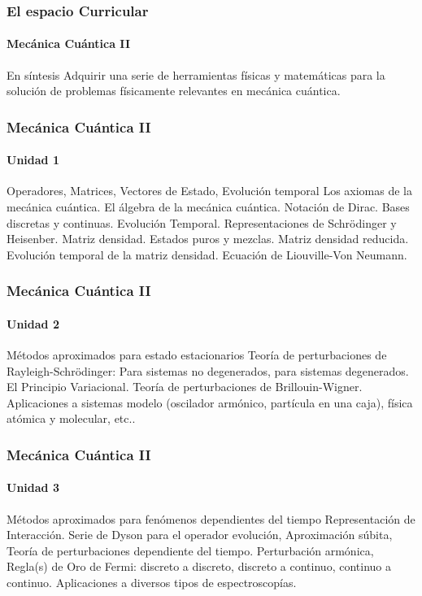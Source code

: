 \documentclass{beamer}
\begin{document}
\begin{frame}
    \frametitle{El espacio Curricular}
    \framesubtitle{Mecánica Cuántica II}

\begin{block}{En síntesis}
    Adquirir una serie de herramientas físicas y matemáticas para la solución
    de problemas físicamente relevantes en mecánica cuántica.
\end{block}
    
\end{frame}

\begin{frame}
    \frametitle{Mecánica Cuántica II}
    \framesubtitle{Unidad 1}

\begin{block}{Operadores, Matrices, Vectores de Estado, Evolución temporal}
    Los axiomas de la mecánica cuántica. El álgebra de la mecánica       
    cuántica. Notación de Dirac. Bases discretas y continuas. Evolución  
    Temporal. Representaciones de Schrödinger y Heisenber. Matriz        
    densidad. Estados puros y mezclas. Matriz densidad reducida.         
    Evolución temporal de la matriz densidad. Ecuación de Liouville-Von  
    Neumann.    
\end{block}
    
\end{frame}

\begin{frame}
    \frametitle{Mecánica Cuántica II}
    \framesubtitle{Unidad 2}

\begin{block}{Métodos aproximados para estado estacionarios}
    Teoría de perturbaciones de Rayleigh-Schrödinger: Para sistemas no   
     degenerados, para sistemas degenerados. El Principio Variacional.    
     Teoría de perturbaciones de Brillouin-Wigner. Aplicaciones a         
     sistemas modelo (oscilador armónico, partícula en una caja), física  
     atómica y molecular, etc.. 
\end{block}
    
\end{frame}

\begin{frame}
    \frametitle{Mecánica Cuántica II}
    \framesubtitle{Unidad 3}

\begin{block}{Métodos aproximados para fenómenos dependientes del tiempo}
    Representación de Interacción. Serie de Dyson para el operador       
     evolución, Aproximación súbita, Teoría de perturbaciones dependiente 
     del tiempo. Perturbación armónica, Regla(s) de Oro de Fermi:         
     discreto a discreto, discreto a continuo, continuo a continuo.       
     Aplicaciones a diversos tipos de espectroscopías.
\end{block}
    
\end{frame}
\end{document}
